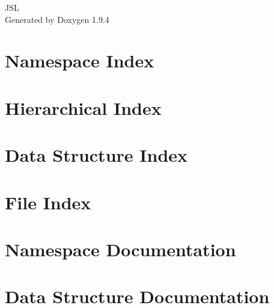 \documentclass[twoside]{book}
\newcommand{\+}{\discretionary{\mbox{\scriptsize$\hookleftarrow$}}{}{}}
\newcommand{\clearemptydoublepage}{%
    \newpage{\pagestyle{empty}\cleardoublepage}%
  }
\begin{document}
  \raggedbottom
    \hypersetup{pageanchor=false,
                bookmarksnumbered=true,
                pdfencoding=unicode
               }
  \begin{titlepage}
  \vspace*{7cm}
  \begin{center}%
  {\Large JSL}\\
  \vspace*{1cm}
  {\large Generated by Doxygen 1.9.4}\\
  \end{center}
  \end{titlepage}
  \clearemptydoublepage
  \tableofcontents
  \clearemptydoublepage
  \hypersetup{pageanchor=true}
\chapter{Namespace Index}

\chapter{Hierarchical Index}

\chapter{Data Structure Index}

\chapter{File Index}

\chapter{Namespace Documentation}





\chapter{Data Structure Documentation}


















\end{document}
